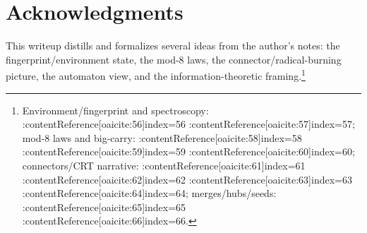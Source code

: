 \documentclass[11pt]{article}
\begin{document}
\section*{Acknowledgments}
This writeup distills and formalizes several ideas from the author's notes: the fingerprint/environment state, the mod-$8$ laws, the connector/radical-burning picture, the automaton view, and the information-theoretic framing.\footnote{Environment/fingerprint and spectroscopy: :contentReference[oaicite:56]{index=56} :contentReference[oaicite:57]{index=57}; mod-$8$ laws and big-carry: :contentReference[oaicite:58]{index=58} :contentReference[oaicite:59]{index=59} :contentReference[oaicite:60]{index=60}; connectors/CRT narrative: :contentReference[oaicite:61]{index=61} :contentReference[oaicite:62]{index=62} :contentReference[oaicite:63]{index=63} :contentReference[oaicite:64]{index=64}; merges/hubs/seeds: :contentReference[oaicite:65]{index=65} :contentReference[oaicite:66]{index=66}.}
\end{document}
